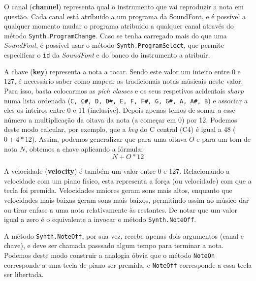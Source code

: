 O canal (\textbf{channel}) representa qual o instrumento que vai reproduzir a nota em questão. Cada canal está atríbuido a um programa da SoundFont, e é possível a qualquer momento mudar o programa atribuido a qualquer canal através do método \texttt{Synth.ProgramChange}. Caso se tenha carregado mais do que uma \textit{SoundFont}, é possível usar o método \texttt{Synth.ProgramSelect}, que permite especificar o \texttt{id} da \textit{SoundFont} e do banco do instrumento a atribuir.

A chave (\textbf{key}) representa a nota a tocar. Sendo este valor um inteiro entre 0 e 127, é necessário saber como mapear as tradicionais notas músicais neste valor. Para isso, basta colocarmos as \textit{pich classes} e os seus respetivos acidentais \textit{sharp} numa lista ordenada (\verb|C, C#, D, D#, E, F, F#, G, G#, A, A#, B|) e associar a eles os inteiros entre 0 e 11 (inclusive). Depois apenas temos de somar a esse número a multiplicação da oitava da nota (a começar em 0) por 12. Podemos deste modo calcular, por exemplo, que a \textit{key} do C central (C4) é igual a 48 ($0 + 4 * 12$). Assim, podemos generalizar que para uma oitava $O$ e para um tom de nota $N$, obtemos a chave aplicando a fórmula:
$$N + O * 12$$

A velocidade (\textbf{velocity}) é também um valor entre 0 e 127. Relacionando a velocidade com um piano físico, esta representa a força (ou velocidade) com que a tecla foi premida. Velocidades maiores geram sons mais altos, enquanto que velocidades mais baixas geram sons mais baixos, permitindo assim ao músico dar ou tirar enfase a uma nota relativamente às restantes. De notar que um valor igual a zero é o equivalente a invocar o método \texttt{Synth.NoteOff}.

A método \texttt{Synth.NoteOff}, por sua vez, recebe apenas dois argumentos (canal e chave), e deve ser chamada passsado algum tempo para terminar a nota. Podemos deste modo construir a analogia óbvia que o método \texttt{NoteOn} corresponde a uma tecla de piano ser premida, e \texttt{NoteOff} corresponde a essa tecla ser libertada.

